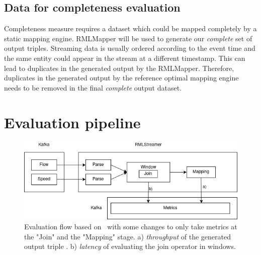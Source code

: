 \subsection{Data for completeness evaluation}
Completeness measure requires a dataset which could be mapped completely by a static 
mapping engine. RMLMapper 
will
be used to generate our \emph{complete} set of output triples. Streaming data is usually 
ordered according to the event time  and the same entity could appear in the 
stream at a different timestamp. This can lead to duplicates in the generated output by 
the RMLMapper. Therefore, duplicates in the generated output by the reference optimal
mapping engine needs to be removed in the final \emph{complete} output dataset.

\section{Evaluation pipeline}

\begin{figure}[!htbp]
    \centering
    \includegraphics[width=\textwidth]{fig/evaluation_architecture.png}
    \caption{Evaluation flow based on~\cite{evalution_of_spe} with some changes to only 
    take metrics at the "Join" and the "Mapping" stage. a) \emph{throughput} of the generated output triple . 
    b) \emph{latency} of evaluating the join operator in windows.}
    \label{fig:evaluation_flow}
    
\end{figure}


